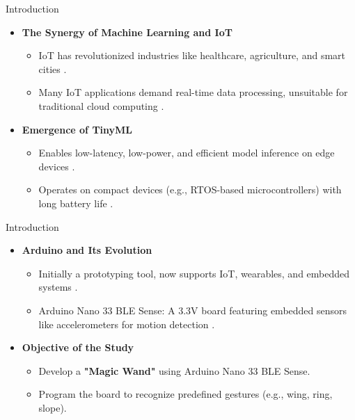%
%
%


\begin{frame}{Introduction}
	\begin{itemize}
		\item \textbf{The Synergy of Machine Learning and IoT}
		\begin{itemize}
			\item IoT has revolutionized industries like healthcare, agriculture, and smart cities \cite{Had:2020}.
			\item Many IoT applications demand real-time data processing, unsuitable for traditional cloud computing \cite{Shi:2016}.
		\end{itemize}
		
		\item \textbf{Emergence of TinyML}
		\begin{itemize}
			\item Enables low-latency, low-power, and efficient model inference on edge devices \cite{Sakr:2020}.
			\item Operates on compact devices (e.g., RTOS-based microcontrollers) with long battery life \cite{Anh:2009} \cite{Aba:2023}.
		\end{itemize}
	\end{itemize}
\end{frame}
\begin{frame}{Introduction}
	\begin{itemize}
		\item \textbf{Arduino and Its Evolution}
		\begin{itemize}
			\item Initially a prototyping tool, now supports IoT, wearables, and embedded systems \cite{Kushner:2011}.
			\item Arduino Nano 33 BLE Sense: A 3.3V board featuring embedded sensors like accelerometers for motion detection \cite{Ard:2021}.
		\end{itemize}
		\item \textbf{Objective of the Study}
		\begin{itemize}
			\item Develop a \textbf{"Magic Wand"} using Arduino Nano 33 BLE Sense.
			\item Program the board to recognize predefined gestures (e.g., wing, ring, slope).
		\end{itemize}
	\end{itemize}
\end{frame}


